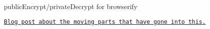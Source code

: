 \href{https://travis-ci.org/crypto-browserify/publicEncrypt}{\tt }

public\+Encrypt/private\+Decrypt for browserify

\href{http://calvinmetcalf.com/post/109301244759/porting-nodejs-crypto-to-the-browser-part-3}{\tt Blog post about the moving parts that have gone into this.} 
